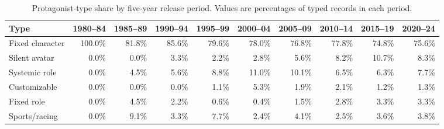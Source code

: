 \begin{table}[t]
\centering
\caption{Protagonist-type share by five-year release period. Values are percentages of typed records in each period.}
\label{tab:protagonist_type_share_half_decades}
\tiny
\setlength{\tabcolsep}{3pt}
\renewcommand{\arraystretch}{1.05}
\begin{tabular}{lrrrrrrrrr}
\toprule
\textbf{Type} & \textbf{1980--84} & \textbf{1985--89} & \textbf{1990--94} & \textbf{1995--99} & \textbf{2000--04} & \textbf{2005--09} & \textbf{2010--14} & \textbf{2015--19} & \textbf{2020--24} \\
\midrule
Fixed character & 100.0\% & 81.8\% & 85.6\% & 79.6\% & 78.0\% & 76.8\% & 77.8\% & 74.8\% & 75.6\% \\
Silent avatar & 0.0\% & 0.0\% & 3.3\% & 2.2\% & 2.8\% & 5.6\% & 8.2\% & 10.7\% & 8.3\% \\
Systemic role & 0.0\% & 4.5\% & 5.6\% & 8.8\% & 11.0\% & 10.1\% & 6.5\% & 6.3\% & 7.7\% \\
Customizable & 0.0\% & 0.0\% & 0.0\% & 1.1\% & 5.3\% & 1.9\% & 2.1\% & 1.2\% & 1.3\% \\
Fixed role & 0.0\% & 4.5\% & 2.2\% & 0.6\% & 0.4\% & 1.5\% & 2.8\% & 3.3\% & 3.3\% \\
Sports/racing & 0.0\% & 9.1\% & 3.3\% & 7.7\% & 2.4\% & 4.1\% & 2.5\% & 3.6\% & 3.8\% \\
\bottomrule
\end{tabular}
\end{table}
